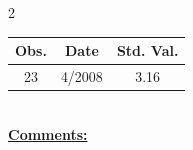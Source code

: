 
\bigskip 
\begin{multicols}{2}{ 
\begin{tabular}{ccc}
\hline  Obs.  &  Date &  Std. Val. \\ 
\hline 
                       23 &        4/2008 &          3.16 \vspace{-.12in} \\  
 \end{tabular} 
\\ 
 \columnbreak 
 \singlespacing 
 \underline{\textbf{Comments:}} \\ 
 \bigskip       

 } 
\end{multicols} 
